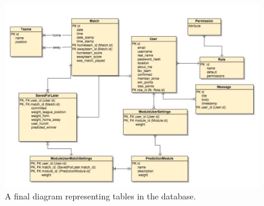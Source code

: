 \begin{figure}[H]
	\begin{center}
		\includegraphics[width=.90\textwidth]{design/images/database_export.jpg}
		\caption{A final diagram representing tables in the database.}
		\label{fig:using:mindmap}
	\end{center}
\end{figure}